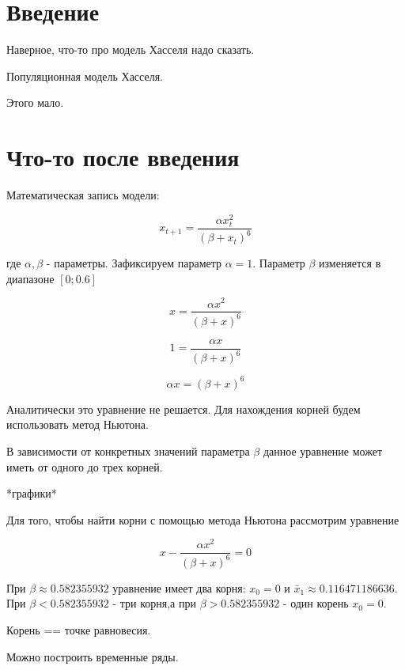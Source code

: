 \section{Введение}

    Наверное, что-то про модель Хасселя надо сказать.

    Популяционная модель Хасселя.

    Этого мало.

\section{Что-то после введения}

    Математическая запись модели:

    \[x_{t+1} = \frac{\alpha x_t^2}{(\beta + x_t)^6}\]

    где \(\alpha, \beta\) - параметры. Зафиксируем параметр \(\alpha = 1\). Параметр \(\beta\) изменяется в диапазоне \([0; 0.6]\)    

    \begin{equation}
        \label{eq1}
        x = \frac{\alpha x^2}{(\beta + x)^6}
    \end{equation}
    
    \[1 = \frac{\alpha x}{(\beta + x)^6}\]

    \[\alpha x = (\beta + x)^6\]

    Аналитически это уравнение не решается. Для нахождения корней будем использовать метод Ньютона.

    В зависимости от конкретных значений параметра \(\beta\) данное уравнение может иметь от одного до трех корней.
    
    *графики*

    Для того, чтобы найти корни с помощью метода Ньютона рассмотрим уравнение 
    
    \[x - \frac{\alpha x^2}{(\beta + x)^6} = 0\]

    При \(\beta \approx 0.582355932\) уравнение имеет два корня: \(x_0 = 0\) и \(\bar{x}_1 \approx 0.116471186636\). При \(\beta < 0.582355932\) - три корня,а при \(\beta > 0.582355932\) - один корень \(x_0 = 0\).
    
    Корень == точке равновесия.

    Можно построить временные ряды.

